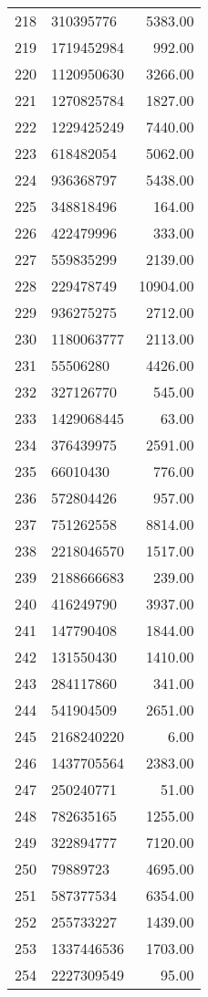 \begin{table}[ht]
\begin{tabular}{rlr}
  218 & 310395776 & 5383.00 \\ 
  219 & 1719452984 & 992.00 \\ 
  220 & 1120950630 & 3266.00 \\ 
  221 & 1270825784 & 1827.00 \\ 
  222 & 1229425249 & 7440.00 \\ 
  223 & 618482054 & 5062.00 \\ 
  224 & 936368797 & 5438.00 \\ 
  225 & 348818496 & 164.00 \\ 
  226 & 422479996 & 333.00 \\ 
  227 & 559835299 & 2139.00 \\ 
  228 & 229478749 & 10904.00 \\ 
  229 & 936275275 & 2712.00 \\ 
  230 & 1180063777 & 2113.00 \\ 
  231 & 55506280 & 4426.00 \\ 
  232 & 327126770 & 545.00 \\ 
  233 & 1429068445 & 63.00 \\ 
  234 & 376439975 & 2591.00 \\ 
  235 & 66010430 & 776.00 \\ 
  236 & 572804426 & 957.00 \\ 
  237 & 751262558 & 8814.00 \\ 
  238 & 2218046570 & 1517.00 \\ 
  239 & 2188666683 & 239.00 \\ 
  240 & 416249790 & 3937.00 \\ 
  241 & 147790408 & 1844.00 \\ 
  242 & 131550430 & 1410.00 \\ 
  243 & 284117860 & 341.00 \\ 
  244 & 541904509 & 2651.00 \\ 
  245 & 2168240220 & 6.00 \\ 
  246 & 1437705564 & 2383.00 \\ 
  247 & 250240771 & 51.00 \\ 
  248 & 782635165 & 1255.00 \\ 
  249 & 322894777 & 7120.00 \\ 
  250 & 79889723 & 4695.00 \\ 
  251 & 587377534 & 6354.00 \\ 
  252 & 255733227 & 1439.00 \\ 
  253 & 1337446536 & 1703.00 \\ 
  254 & 2227309549 & 95.00 \\ 

\end{tabular}
\end{table}
